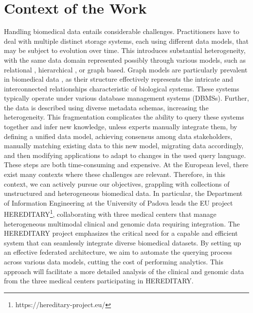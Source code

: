 
\chapter{Context of the Work}
\label{chp:context}
Handling biomedical data entails considerable challenges. Practitioners have to deal with multiple distinct storage systems, each using different data models, that may be subject to evolution over time. This introduces substantial heterogeneity, with the same data domain represented possibly through various models, such as relational \cite{DBLP:journals/nar/HardingAFSADPSD22}, hierarchical \cite{DBLP:journals/nar/WishartKGSHSCW06}, or graph based. Graph models are particularly prevalent in biomedical data \cite{DBLP:journals/nar/PineroBQGDCGSF17} \cite{DBLP:journals/nar/GillespieJSMRSG22}, as their structure effectively represents the intricate and interconnected relationships characteristic of biological systems.
These systems typically operate under various database management systems (DBMSs). Further, the data is described using diverse metadata schemas, increasing the heterogeneity. This fragmentation complicates the ability to query these systems together and infer new knowledge, unless experts manually integrate them, by defining a unified data model, achieving consensus among data stakeholders, manually matching existing data to this new model, migrating data accordingly, and then modifying applications to adapt to changes in the used query language. These steps are both time-consuming and expensive.
At the European level, there exist many contexts where these challenges are relevant. Therefore, in this context, we can actively pursue our objectives, grappling with collections of unstructured and heterogeneous biomedical data. In particular, the Department of Information Engineering at the University of Padova leads the \ac{EU} project \ac{HEREDITARY}\footnote{https://hereditary-project.eu/}, collaborating with three medical centers that manage heterogeneous multimodal clinical and genomic data requiring integration. The \ac{HEREDITARY} project emphasizes the critical need for a capable and efficient system that can seamlessly integrate diverse biomedical datasets. By setting up an effective federated architecture, we aim to automate the querying process across various data models, cutting the cost of performing analytics. This approach will facilitate a more detailed analysis of the clinical and genomic data from the three medical centers participating in \ac{HEREDITARY}.

